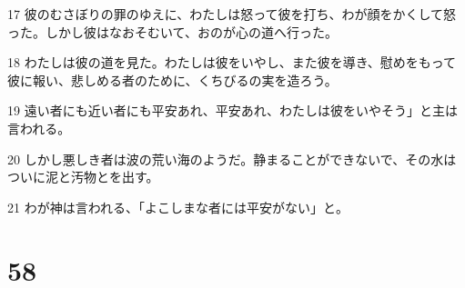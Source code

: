 \par 17 彼のむさぼりの罪のゆえに、わたしは怒って彼を打ち、わが顔をかくして怒った。しかし彼はなおそむいて、おのが心の道へ行った。
\par 18 わたしは彼の道を見た。わたしは彼をいやし、また彼を導き、慰めをもって彼に報い、悲しめる者のために、くちびるの実を造ろう。
\par 19 遠い者にも近い者にも平安あれ、平安あれ、わたしは彼をいやそう」と主は言われる。
\par 20 しかし悪しき者は波の荒い海のようだ。静まることができないで、その水はついに泥と汚物とを出す。
\par 21 わが神は言われる、「よこしまな者には平安がない」と。

\chapter{58}


